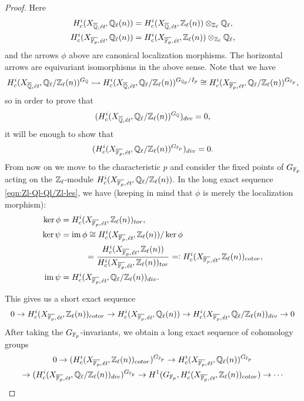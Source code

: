 \documentclass{article}
\numberwithin{equation}{section}
\begin{document}
\begin{proposition}
\begin{proof}
    Here
    \begin{align*}
      H_c^i (X_{\overline{\mathbb{Q}},\text{\it ét}}, \mathbb{Q}_\ell (n)) & = H_c^i (X_{\overline{\mathbb{Q}},\text{\it ét}}, \mathbb{Z}_\ell (n))\otimes_{\mathbb{Z}_\ell} \mathbb{Q}_\ell,\\
      H_c^i (X_{\overline{\mathbb{F}_p},\text{\it ét}}, \mathbb{Q}_\ell (n)) & = H_c^i (X_{\overline{\mathbb{F}_p},\text{\it ét}}, \mathbb{Z}_\ell (n))\otimes_{\mathbb{Z}_\ell} \mathbb{Q}_\ell,
    \end{align*}
    and the arrows $\phi$ above are canonical localization morphisms.
    The horizontal arrows are equivariant isomorphisms in the above sense. Note
    that we have
    \[ H^i_c (X_{\overline{\mathbb{Q}}, \text{\it ét}}, \mathbb{Q}_\ell/\mathbb{Z}_\ell (n))^{G_{\mathbb{Q}}} \rightarrowtail
    H^i_c (X_{\overline{\mathbb{Q}}, \text{\it ét}}, \mathbb{Q}_\ell/\mathbb{Z}_\ell (n))^{G_{\mathbb{Q}_p}/I_p}
    \cong H^i_c (X_{\overline{\mathbb{F}_p}, \text{\it ét}}, \mathbb{Q}_\ell/\mathbb{Z}_\ell (n))^{G_{\mathbb{F}_p}}, \]
    so in order to prove that
    $$(H^i_c (X_{\overline{\mathbb{Q}},\text{\it ét}}, \mathbb{Q}_\ell/\mathbb{Z}_\ell (n))^{G_{\mathbb{Q}}})_{div} = 0,$$
    it will be enough to show that
    $$(H^i_c (X_{\overline{\mathbb{F}_p},\text{\it ét}}, \mathbb{Q}_\ell/\mathbb{Z}_\ell (n))^{G_{\mathbb{F}_p}})_{div} = 0.$$
    From now on we move to the characteristic $p$ and consider the fixed points
    of $G_{\mathbb{F}_p}$ acting on the $\mathbb{Z}_\ell$-module
    $H^i_c (X_{\overline{\mathbb{F}_p},\text{\it ét}}, \mathbb{Q}_\ell/\mathbb{Z}_\ell (n))$.
    In the long exact sequence \eqref{eqn:Zl-Ql-Ql/Zl-les}, we have (keeping in
    mind that $\phi$ is merely the localization morphism):
    \begin{align*}
      \ker \phi & = H^i_c (X_{\overline{\mathbb{F}_p},\text{\it ét}}, \mathbb{Z}_\ell (n))_{tor},\\
      \ker \psi & = \operatorname{im} \phi \cong H^i_c (X_{\overline{\mathbb{F}_p},\text{\it ét}}, \mathbb{Z}_\ell (n)) / \ker \phi \\
      & \quad\quad\quad = \frac{H^i_c (X_{\overline{\mathbb{F}_p},\text{\it ét}}, \mathbb{Z}_\ell (n))}{H^i_c (X_{\overline{\mathbb{F}_p},\text{\it ét}}, \mathbb{Z}_\ell (n))_{tor}} =\mathrel{\mathop:} H^i_c (X_{\overline{\mathbb{F}_p},\text{\it ét}}, \mathbb{Z}_\ell (n))_{cotor},\\
      \operatorname{im} \psi & = H_c^i (X_{\overline{\mathbb{F}_p},\text{\it ét}}, \mathbb{Q}_\ell/\mathbb{Z}_\ell (n))_{div}.
    \end{align*}

    This gives us a short exact sequence
    \[ 0 \to H^i_c (X_{\overline{\mathbb{F}_p},\text{\it ét}}, \mathbb{Z}_\ell (n))_{cotor} \to
    H^i_c (X_{\overline{\mathbb{F}_p},\text{\it ét}}, \mathbb{Q}_\ell (n)) \to
    H^i_c (X_{\overline{\mathbb{F}_p},\text{\it ét}}, \mathbb{Q}_\ell/\mathbb{Z}_\ell (n))_{div} \to 0 \]
    After taking the $G_{\mathbb{F}_p}$-invariants, we obtain a long exact sequence
    of cohomology groups
    \begin{multline}
      \label{eqn:cohomology-long-exact-sequence-with-GFp}
      0 \to (H^i_c (X_{\overline{\mathbb{F}_p},\text{\it ét}}, \mathbb{Z}_\ell (n))_{cotor})^{G_{\mathbb{F}_p}} \to
      H^i_c (X_{\overline{\mathbb{F}_p},\text{\it ét}}, \mathbb{Q}_\ell (n))^{G_{\mathbb{F}_p}} \\
      \to (H^i_c (X_{\overline{\mathbb{F}_p},\text{\it ét}}, \mathbb{Q}_\ell/\mathbb{Z}_\ell (n))_{div})^{G_{\mathbb{F}_p}} \to
      H^1 (G_{\mathbb{F}_p}, H^i_c (X_{\overline{\mathbb{F}_p},\text{\it ét}}, \mathbb{Z}_\ell (n))_{cotor}) \to \cdots
    \end{multline}


\end{proof}
\end{proposition}
\end{document}
